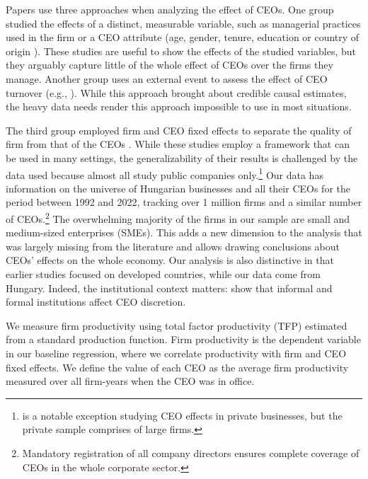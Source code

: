\documentclass[11pt,a4paper]{article}
\begin{document}
Papers use three approaches when analyzing the effect of CEOs. One group studied the effects of a distinct, measurable variable, such as managerial practices used in the firm \citep{bloom2012organization} or a CEO attribute (age, gender, tenure, education or country of origin \citep{anderson2018pathways, henderson2006quickly, Koren2023expat}). These studies are useful to show the effects of the studied variables, but they arguably capture little of the whole effect of CEOs over the firms they manage. Another group uses an external event to assess the effect of CEO turnover (e.g., \citet{bennedsen2020ceos}). While this approach brought about credible causal estimates, the heavy data needs render this approach impossible to use in most situations. 

The third group employed firm and CEO fixed effects to separate the quality of firm from that of the CEOs \citep{Bertrand2003-io, crossland2011differences, quigley2015has}. While these studies employ a framework that can be used in many settings, the generalizability of their results is challenged by the data used because almost all study public companies only.\footnote{\citet{quigley2022ceo} is a notable exception studying CEO effects in private businesses, but the private sample comprises of large firms.} Our data has information on the universe of Hungarian businesses and all their CEOs for the period between 1992 and 2022, tracking over 1 million firms and a similar number of CEOs.\footnote{Mandatory registration of all company directors ensures complete coverage of CEOs in the whole corporate sector.} The overwhelming majority of the firms in our sample are small and medium-sized enterprises (SMEs). This adds a new dimension to the analysis that was largely missing from the literature and allows drawing conclusions about CEOs' effects on the whole economy. Our analysis is also distinctive in that earlier studies focused on developed countries, while our data come from Hungary. Indeed, the institutional context matters: \citet{crossland2011differences} show that informal and formal institutions affect CEO discretion.

We measure firm productivity using total factor productivity (TFP) estimated from a standard production function. Firm productivity is the dependent variable in our baseline regression, where we correlate productivity with firm and CEO fixed effects. We define the value of each CEO as the average firm productivity measured over all firm-years when the CEO was in office.
\end{document}
